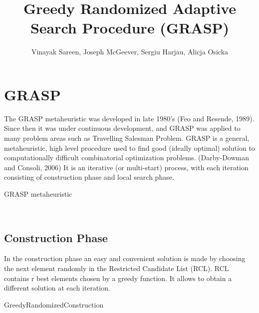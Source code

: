 \documentclass[12pt]{article}
\title {Greedy Randomized Adaptive Search Procedure (GRASP)}
\author{ {
		Vinayak Sareen, Joseph McGeever, Sergiu Harjau, Alicja Osicka	
	}
}
\date{}
\begin{document}
	\maketitle
	\section{GRASP}
The GRASP metaheuristic was developed in late 1980’s (Feo and Resende, 1989). Since then it was under continuous development, and GRASP was applied to many problem areas such as Travelling Salesman Problem.
GRASP is a general, metaheuristic, high level procedure used to find good (ideally optimal) solution to computationally difficult combinatorial optimization problems. (Darby-Dowman and Consoli, 2006) It is an iterative (or multi-start) process, with each iteration consisting of construction phase and local search phase. 
\begin{algorithm}
\caption{ GRASP metaheuristic}
\\
\begin {algorithmic}
\EndFor
\State {}
\end{algorithmic}
\end{algorithm}


\subsection {Construction Phase}

In the construction phase an easy and convenient solution is made by choosing the next element randomly in the Restricted Candidate List (RCL). RCL contains r best elements chosen by a greedy function. It allows to obtain a different solution at each iteration. 
\begin{algorithm}
\caption{ GreedyRandomizedConstruction}
\\
\begin {algorithmic}
 
	\EndWhile
	\State {}

\end{algorithmic}
\end{algorithm}
\end{document}
